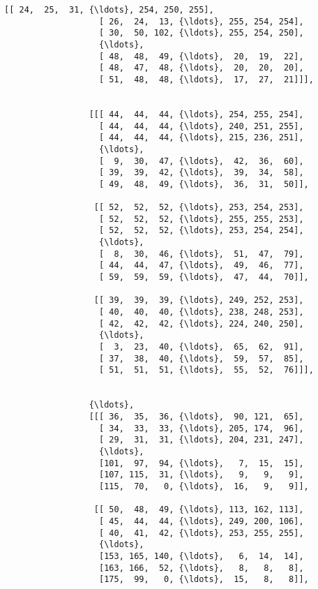 \documentclass[11pt]{article}
\begin{document}
\begin{Verbatim}[commandchars=\\\{\}]
                  [[ 24,  25,  31, {\ldots}, 254, 250, 255],
                   [ 26,  24,  13, {\ldots}, 255, 254, 254],
                   [ 30,  50, 102, {\ldots}, 255, 254, 250],
                   {\ldots}, 
                   [ 48,  48,  49, {\ldots},  20,  19,  22],
                   [ 48,  47,  48, {\ldots},  20,  20,  20],
                   [ 51,  48,  48, {\ldots},  17,  27,  21]]],
          
          
                 [[[ 44,  44,  44, {\ldots}, 254, 255, 254],
                   [ 44,  44,  44, {\ldots}, 240, 251, 255],
                   [ 44,  44,  44, {\ldots}, 215, 236, 251],
                   {\ldots}, 
                   [  9,  30,  47, {\ldots},  42,  36,  60],
                   [ 39,  39,  42, {\ldots},  39,  34,  58],
                   [ 49,  48,  49, {\ldots},  36,  31,  50]],
          
                  [[ 52,  52,  52, {\ldots}, 253, 254, 253],
                   [ 52,  52,  52, {\ldots}, 255, 255, 253],
                   [ 52,  52,  52, {\ldots}, 253, 254, 254],
                   {\ldots}, 
                   [  8,  30,  46, {\ldots},  51,  47,  79],
                   [ 44,  44,  47, {\ldots},  49,  46,  77],
                   [ 59,  59,  59, {\ldots},  47,  44,  70]],
          
                  [[ 39,  39,  39, {\ldots}, 249, 252, 253],
                   [ 40,  40,  40, {\ldots}, 238, 248, 253],
                   [ 42,  42,  42, {\ldots}, 224, 240, 250],
                   {\ldots}, 
                   [  3,  23,  40, {\ldots},  65,  62,  91],
                   [ 37,  38,  40, {\ldots},  59,  57,  85],
                   [ 51,  51,  51, {\ldots},  55,  52,  76]]],
          
          
                 {\ldots}, 
                 [[[ 36,  35,  36, {\ldots},  90, 121,  65],
                   [ 34,  33,  33, {\ldots}, 205, 174,  96],
                   [ 29,  31,  31, {\ldots}, 204, 231, 247],
                   {\ldots}, 
                   [101,  97,  94, {\ldots},   7,  15,  15],
                   [107, 115,  31, {\ldots},   9,   9,   9],
                   [115,  70,   0, {\ldots},  16,   9,   9]],
          
                  [[ 50,  48,  49, {\ldots}, 113, 162, 113],
                   [ 45,  44,  44, {\ldots}, 249, 200, 106],
                   [ 40,  41,  42, {\ldots}, 253, 255, 255],
                   {\ldots}, 
                   [153, 165, 140, {\ldots},   6,  14,  14],
                   [163, 166,  52, {\ldots},   8,   8,   8],
                   [175,  99,   0, {\ldots},  15,   8,   8]],
          

\end{Verbatim}
\end{document}

